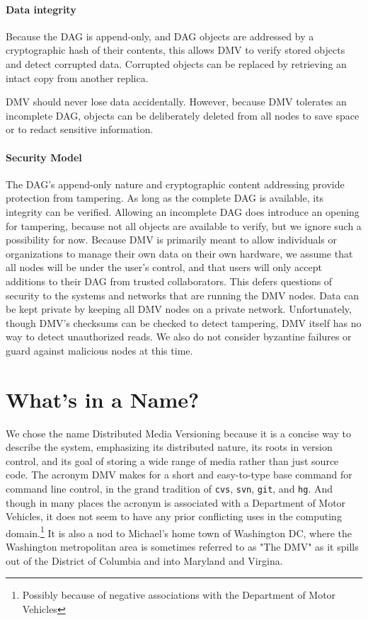 \paragraph{Data integrity}

Because the DAG is append-only, and DAG objects are addressed by a cryptographic
hash of their contents, this allows DMV to verify stored objects and detect
corrupted data. Corrupted objects can be replaced by retrieving an intact copy
from another replica.

DMV should never lose data accidentally. However, because DMV tolerates an
incomplete DAG, objects can be deliberately deleted from all nodes to save space
or to redact sensitive information.


\paragraph{Security Model}

The DAG's append-only nature and cryptographic content addressing provide
protection from tampering. As long as the complete DAG is available, its
integrity can be verified. Allowing an incomplete DAG does introduce an opening
for tampering, because not all objects are available to verify, but we ignore
such a possibility for now. Because DMV is primarily meant to allow individuals
or organizations to manage their own data on their own hardware, we assume that
all nodes will be under the user's control, and that users will only accept
additions to their DAG from trusted collaborators. This defers questions of
security to the systems and networks that are running the DMV nodes. Data can be
kept private by keeping all DMV nodes on a private network. Unfortunately,
though DMV's checksums can be checked to detect tampering, DMV itself has no way
to detect unauthorized reads. We also do not consider byzantine failures or
guard against malicious nodes at this time.

%


\section{What's in a Name?}

We chose the name Distributed Media Versioning because it is a concise way to
describe the system, emphasizing its distributed nature, its roots in version
control, and its goal of storing a wide range of media rather than just source
code. The acronym DMV makes for a short and easy-to-type base command for
command line control, in the grand tradition of \lstinline{cvs},
\lstinline{svn}, \lstinline{git}, and \lstinline{hg}. And though in many places
the acronym is associated with a Department of Motor Vehicles, it does not seem
to have any prior conflicting uses in the computing domain.\footnote{Possibly
because of negative associations with the Department of Motor Vehicles} It is
also a nod to Michael's home town of Washington DC, where the Washington
metropolitan area is sometimes referred to as "The DMV" as it spills out of the
District of Columbia and into Maryland and Virgina.
